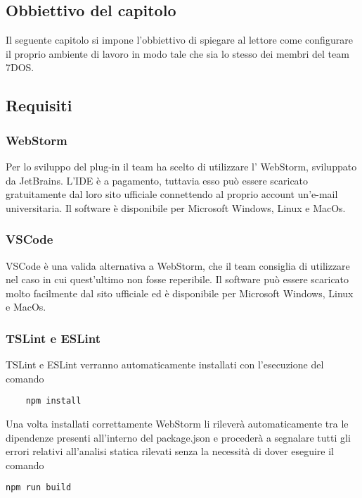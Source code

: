 \subsection{Obbiettivo del capitolo}
Il seguente capitolo si impone l'obbiettivo di spiegare al lettore come configurare il proprio ambiente di lavoro in modo tale che sia lo stesso dei membri del team 7DOS.  
\subsection{Requisiti}

\subsubsection{WebStorm}
Per lo sviluppo del plug-in il team ha scelto di utilizzare l' WebStorm, sviluppato da JetBrains. L'IDE è a pagamento, tuttavia esso può essere scaricato gratuitamente dal loro sito ufficiale connettendo al proprio account un'e-mail universitaria.
Il software è disponibile per Microsoft Windows, Linux e MacOs.
\subsubsection{VSCode}
VSCode è una valida alternativa a WebStorm, che il team consiglia di utilizzare nel caso in cui quest'ultimo non fosse reperibile.
Il software può essere scaricato molto facilmente dal sito ufficiale ed è disponibile per Microsoft Windows, Linux e MacOs.
\subsubsection{TSLint e ESLint}
TSLint e ESLint verranno automaticamente installati con l'esecuzione del comando
\begin{verbatim}
	npm install
\end{verbatim}
Una volta installati correttamente WebStorm li rileverà automaticamente tra le dipendenze presenti all'interno del package.json e procederà a segnalare tutti gli errori relativi all'analisi statica rilevati senza la necessità di dover eseguire il comando
\begin{verbatim}
npm run build
\end{verbatim}

